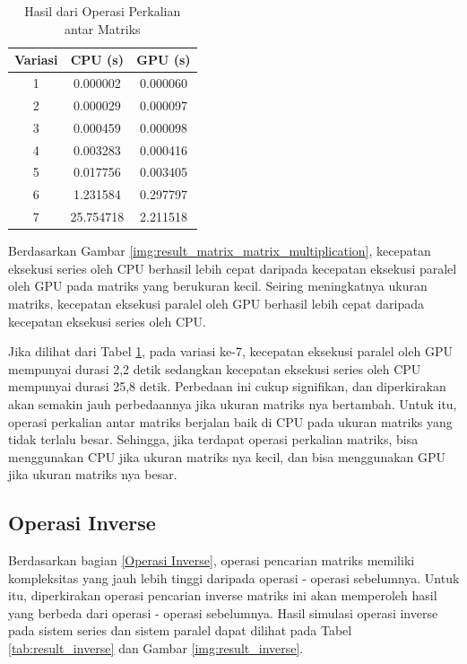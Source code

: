 \begin{table}[H]
	\centering
	\caption{Hasil dari Operasi Perkalian antar Matriks}
	\label{tab:result_matrix_matrix_multiplication}
	\begin{tabular}{ccc}
		\toprule
		Variasi & CPU (s)   & GPU (s)  \\
		\midrule
		1       & 0.000002  & 0.000060 \\
		2       & 0.000029  & 0.000097 \\
		3       & 0.000459  & 0.000098 \\
		4       & 0.003283  & 0.000416 \\
		5       & 0.017756  & 0.003405 \\
		6       & 1.231584  & 0.297797 \\
		7       & 25.754718 & 2.211518 \\
		\bottomrule
	\end{tabular}
\end{table}

Berdasarkan Gambar \ref{img:result_matrix_matrix_multiplication}, kecepatan eksekusi series oleh CPU berhasil lebih cepat daripada kecepatan eksekusi paralel oleh GPU pada matriks yang berukuran kecil. Seiring meningkatnya ukuran matriks, kecepatan eksekusi paralel oleh GPU berhasil lebih cepat daripada kecepatan eksekusi series oleh CPU.

Jika dilihat dari Tabel \ref{tab:result_matrix_matrix_multiplication}, pada variasi ke-7, kecepatan eksekusi paralel oleh GPU mempunyai durasi 2,2 detik sedangkan kecepatan eksekusi series oleh CPU mempunyai durasi 25,8 detik. Perbedaan ini cukup signifikan, dan diperkirakan akan semakin jauh perbedaannya jika ukuran matriks nya bertambah. Untuk itu, operasi perkalian antar matriks berjalan baik di CPU pada ukuran matriks yang tidak terlalu besar. Sehingga, jika terdapat operasi perkalian matriks, bisa menggunakan CPU jika ukuran matriks nya kecil, dan bisa menggunakan GPU jika ukuran matriks nya besar.

\subsection{Operasi Inverse}

Berdasarkan bagian \ref{Operasi Inverse}, operasi pencarian matriks memiliki kompleksitas yang jauh lebih tinggi daripada operasi - operasi sebelumnya. Untuk itu, diperkirakan operasi pencarian inverse matriks ini akan memperoleh hasil yang berbeda dari operasi - operasi sebelumnya. Hasil simulasi operasi inverse pada sistem series dan sistem paralel dapat dilihat pada Tabel \ref{tab:result_inverse} dan Gambar \ref{img:result_inverse}.

